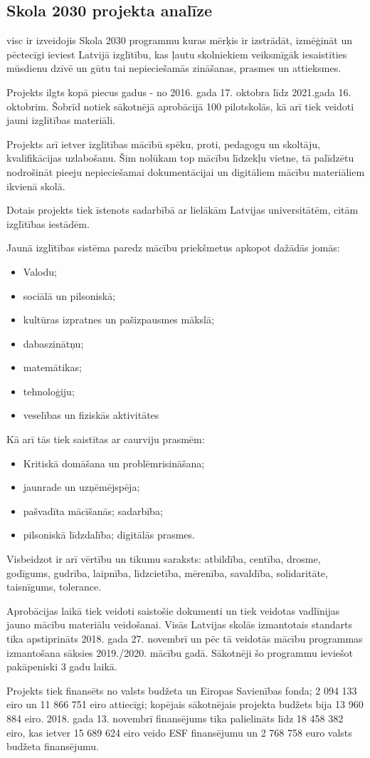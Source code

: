 \subsection{Skola 2030 projekta analīze}
\gls{visc} ir izveidojis Skola 2030 programmu kuras mērķis ir izstrādāt, izmēģināt un pēctecīgi ieviest Latvijā
izglītību, kas ļautu skolniekiem veiksmīgāk iesaistīties mūsdienu dzīvē un gūtu tai nepieciešamās zināšanas,
prasmes un attieksmes.
\par
Projekts ilgts kopā piecus gadus - no 2016. gada 17. oktobra līdz 2021.gada 16. oktobrim. Šobrīd notiek
sākotnējā aprobācijā 100 pilotskolās, kā arī tiek veidoti jauni izglītības materiāli.
\par
Projekts arī ietver izglītības mācībū spēku, proti, pedagogu un skoltāju, kvalifikācijas uzlabošanu. Šim nolūkam
top mācību līdzekļu vietne, tā palīdzētu nodrošināt pieeju nepieciešamai dokumentācijai un digitāliem mācību
materiāliem ikvienā skolā. 
\par
Dotais projekts tiek īstenots sadarbībā ar lielākām Latvijas universitātēm, citām izglītības iestādēm.
\par
Jaunā izglītības sistēma paredz mācību priekšmetus apkopot dažādās jomās:
\begin{itemize}
    \item Valodu; 
    \item sociālā un pilsoniskā;
    \item kultūras izpratnes un pašizpausmes mākslā;
    \item dabaszinātņu; 
    \item matemātikas;
    \item tehnoloģiju;
    \item veselības un fiziskās aktivitātes
\end{itemize}
Kā arī tās tiek saistītas ar caurviju prasmēm:
\begin{itemize}
    \item Kritiskā domāšana un problēmrisināšana;
    \item jaunrade un uzņēmējspēja; 
    \item pašvadīta mācīšanās; sadarbība;
    \item pilsoniskā līdzdalība; digitālās prasmes.
\end{itemize}
Visbeidzot ir arī vērtību un tikumu saraksts: atbildība, centība, drosme, godīgums, gudrība,
laipnība, līdzcietība, mērenība, savaldība, solidaritāte, taisnīgums, tolerance.
\par
Aprobācijas laikā tiek veidoti saistošie dokumenti un tiek veidotas vadlīnijas jauno mācību materiālu veidošanai.
Visās Latvijas skolās izmantotais standarts tika apstiprināts 2018. gada 27. novembrī un pēc tā veidotās mācību
programmas izmantošana sāksies 2019./2020. mācību gadā. Sākotnēji šo programmu ieviešot pakāpeniski 3 gadu laikā.
\par
Projekts tiek finansēts no valsts budžeta un Eiropas Savienības fonda; 2 094 133 eiro un 11 866 751 eiro attiecīgi;
kopējais sākotnējais projekta budžets bija 13 960 884 eiro. 2018. gada 13. novembrī finansējums tika palielināts
līdz 18 458 382 eiro, kas ietver 15 689 624 eiro veido ESF finansējumu un  2 768 758 euro valsts budžeta finansējumu.     
